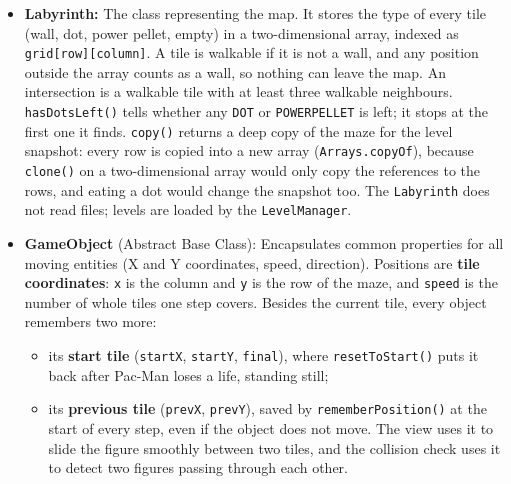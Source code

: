 \documentclass[11pt, a4paper]{article}
\begin{document}
\begin{itemize}
    \textbf{Saving and loading:} The \texttt{saveGameState(file)} method writes this engine to a file, while the \texttt{loadGameState(file)} method is a \textbf{static factory}: it returns a brand new \texttt{GameEngine} read from the file, instead of filling in an existing one, because most fields (\texttt{map}, \texttt{pacman}, \texttt{ghosts}, \texttt{random}, \ldots) are \texttt{final} and cannot be reassigned after construction. This is the same idea as the \texttt{loadFromCSV} method of the \texttt{LevelManager} returning a new \texttt{LevelData}. See Section~\ref{sec:io}.
    \item \textbf{Labyrinth:} The class representing the map. It stores the type of every tile (wall, dot, power pellet, empty) in a two-dimensional array, indexed as \texttt{grid[row][column]}. A tile is walkable if it is not a wall, and any position outside the array counts as a wall, so nothing can leave the map. An intersection is a walkable tile with at least three walkable neighbours. \texttt{hasDotsLeft()} tells whether any \texttt{DOT} or \texttt{POWERPELLET} is left; it stops at the first one it finds. \texttt{copy()} returns a deep copy of the maze for the level snapshot: every row is copied into a new array (\texttt{Arrays.copyOf}), because \texttt{clone()} on a two-dimensional array would only copy the references to the rows, and eating a dot would change the snapshot too. The \texttt{Labyrinth} does not read files; levels are loaded by the \texttt{LevelManager}.
    \item \textbf{GameObject} (Abstract Base Class): Encapsulates common properties for all moving entities (X and Y coordinates, speed, direction). Positions are \textbf{tile coordinates}: \texttt{x} is the column and \texttt{y} is the row of the maze, and \texttt{speed} is the number of whole tiles one step covers. Besides the current tile, every object remembers two more:
    \begin{itemize}
        \item its \textbf{start tile} (\texttt{startX}, \texttt{startY}, \texttt{final}), where \texttt{resetToStart()} puts it back after Pac-Man loses a life, standing still;
        \item its \textbf{previous tile} (\texttt{prevX}, \texttt{prevY}), saved by \texttt{rememberPosition()} at the start of every step, even if the object does not move. The view uses it to slide the figure smoothly between two tiles, and the collision check uses it to detect two figures passing through each other.
    \end{itemize}

\end{itemize}
\end{document}
